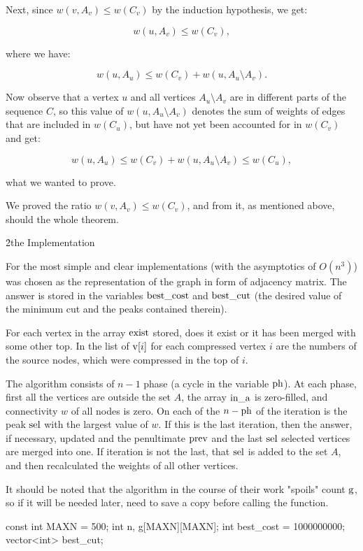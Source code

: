 Next, since $w(v,A_v) \le w(C_v)$ by the induction hypothesis, we get:

$$ w(u,A_v) \le w(C_v), $$

where we have:

$$ w(u,A_u) \le w(C_v) + w(u,A_u \setminus A_v). $$

Now observe that a vertex $u$ and all vertices $A_u \setminus A_v$ are in different parts of the sequence $C$, so this value of $w(u,A_u \setminus A_v)$ denotes the sum of weights of edges that are included in $w(C_u)$, but have not yet been accounted for in $w(C_v)$ and get:

$$ w(u,A_u) \le w(C_v) + w(u,A_u \setminus A_v) \le w(C_u), $$

what we wanted to prove.

We proved the ratio $w(v,A_v) \le w(C_v)$, and from it, as mentioned above, should the whole theorem.


\h2{the Implementation}

For the most simple and clear implementations (with the asymptotics of $O(n^3)$) was chosen as the representation of the graph in form of adjacency matrix. The answer is stored in the variables $\rm best\_cost$ and $\rm best\_cut$ (the desired value of the minimum cut and the peaks contained therein).

For each vertex in the array $\rm exist$ stored, does it exist or it has been merged with some other top. In the list of ${\rm v}[i]$ for each compressed vertex $i$ are the numbers of the source nodes, which were compressed in the top of $i$.

The algorithm consists of $n-1$ phase (a cycle in the variable $\rm ph$). At each phase, first all the vertices are outside the set $A$, the array $\rm in\_a$ is zero-filled, and connectivity $w$ of all nodes is zero. On each of the $n-{\rm ph}$ of the iteration is the peak $\rm sel$ with the largest value of $w$. If this is the last iteration, then the answer, if necessary, updated and the penultimate $\rm prev$ and the last $\rm sel$ selected vertices are merged into one. If iteration is not the last, that $\rm sel$ is added to the set $A$, and then recalculated the weights of all other vertices.

It should be noted that the algorithm in the course of their work "spoils" count $\rm g$, so if it will be needed later, need to save a copy before calling the function.

\code
const int MAXN = 500;
int n, g[MAXN][MAXN];
int best_cost = 1000000000;
vector<int> best_cut;

